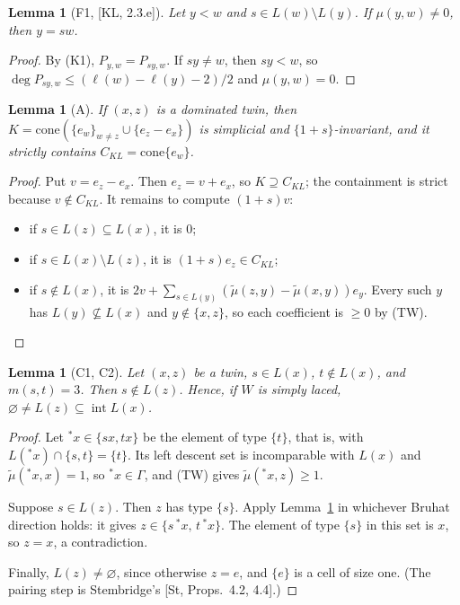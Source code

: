 \documentclass[11pt]{amsart}
\newcommand{\intr}{\operatorname{int}}
\newcommand{\tmu}{\tilde\mu}
\theoremstyle{plain}
\newtheorem{lemma}[theorem]{Lemma}
\theoremstyle{definition}
\begin{document}
\begin{lemma}[F1, {[KL, 2.3.e]}]\label{F1}
Let $y<w$ and $s\in L(w)\setminus L(y)$. If $\mu(y,w)\ne0$, then $y=sw$.
\end{lemma}
\begin{proof}
By (K1), $P_{y,w}=P_{sy,w}$. If $sy\neq w$, then $sy<w$, so $\deg P_{sy,w}\le(\ell(w)-\ell(y)-2)/2$ and $\mu(y,w)=0$.
\end{proof}

\begin{lemma}[A]\label{A}
If $(x,z)$ is a dominated twin, then $K=\mathrm{cone}(\{e_w\}_{w\ne z}\cup\{e_z-e_x\})$ is simplicial and $\{1+s\}$-invariant, and it strictly contains $C_{KL}=\mathrm{cone}\{e_w\}$.
\end{lemma}
\begin{proof}
Put $v=e_z-e_x$. Then $e_z=v+e_x$, so $K\supseteq C_{KL}$; the containment is strict because $v\notin C_{KL}$. It remains to compute $(1+s)v$:
\begin{itemize}[leftmargin=*,itemsep=0pt]
\item if $s\in L(z)\subseteq L(x)$, it is $0$;
\item if $s\in L(x)\setminus L(z)$, it is $(1+s)e_z\in C_{KL}$;
\item if $s\notin L(x)$, it is $2v+\sum_{s\in L(y)}(\tmu(z,y)-\tmu(x,y))e_y$. Every such $y$ has $L(y)\not\subseteq L(x)$ and $y\notin\{x,z\}$, so each coefficient is $\ge0$ by (TW).\qedhere
\end{itemize}
\end{proof}

\begin{lemma}[C1, C2]\label{C}
Let $(x,z)$ be a twin, $s\in L(x)$, $t\notin L(x)$, and $m(s,t)=3$. Then $s\notin L(z)$. Hence, if $W$ is simply laced, $\varnothing\neq L(z)\subseteq\intr L(x)$.
\end{lemma}
\begin{proof}
Let ${}^*x\in\{sx,tx\}$ be the element of type $\{t\}$, that is, with $L({}^*x)\cap\{s,t\}=\{t\}$. Its left descent set is incomparable with $L(x)$ and $\tmu({}^*x,x)=1$, so ${}^*x\in\Gamma$, and (TW) gives $\tmu({}^*x,z)\ge1$.

Suppose $s\in L(z)$. Then $z$ has type $\{s\}$. Apply Lemma~\ref{F1} in whichever Bruhat direction holds: it gives $z\in\{s\,{}^*x,\,t\,{}^*x\}$. The element of type $\{s\}$ in this set is $x$, so $z=x$, a contradiction.

Finally, $L(z)\ne\varnothing$, since otherwise $z=e$, and $\{e\}$ is a cell of size one.
(The pairing step is Stembridge's [St, Props.~4.2, 4.4].)
\end{proof}
\end{document}
